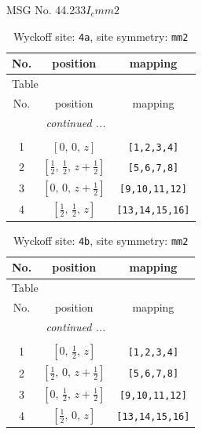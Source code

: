 \documentclass[fleqn,8pt]{jsarticle}
\begin{document}
\setcounter{MaxMatrixCols}{32}

\renewcommand{\tablename}{Table~}
\renewcommand{\figurename}{Figure~}
\begin{center}
\LARGE
MSG No. 44.233\quad$I_{c}mm2$
\end{center}
\renewcommand{\arraystretch}{1.2}
\begin{longtable}{ccc}
\caption{Wyckoff site: {\tt 4a}, site symmetry: {\tt mm2}}
 \\
 \hline \hline
No. & position & mapping \\ \hline \endfirsthead

\multicolumn{2}{l}{\tablename\ \thetable{}} \\
 \hline \hline
No. & position & mapping \\ \hline \endhead

 \hline \hline
\multicolumn{2}{r}{\footnotesize\it continued ...} \\ \endfoot

 \hline \hline
\multicolumn{2}{r}{} \\ \endlastfoot

1 & $\left[ 0,\, 0,\, z \right]$ & {\tt [1,2,3,4]} \\ \hline
2 & $\left[ \frac{1}{2},\, \frac{1}{2},\, z + \frac{1}{2} \right]$ & {\tt [5,6,7,8]} \\ \hline
3 & $\left[ 0,\, 0,\, z + \frac{1}{2} \right]$ & {\tt [9,10,11,12]} \\ \hline
4 & $\left[ \frac{1}{2},\, \frac{1}{2},\, z \right]$ & {\tt [13,14,15,16]} \\
\end{longtable}
\renewcommand{\arraystretch}{1.2}
\begin{longtable}{ccc}
\caption{Wyckoff site: {\tt 4b}, site symmetry: {\tt mm2}}
 \\
 \hline \hline
No. & position & mapping \\ \hline \endfirsthead

\multicolumn{2}{l}{\tablename\ \thetable{}} \\
 \hline \hline
No. & position & mapping \\ \hline \endhead

 \hline \hline
\multicolumn{2}{r}{\footnotesize\it continued ...} \\ \endfoot

 \hline \hline
\multicolumn{2}{r}{} \\ \endlastfoot

1 & $\left[ 0,\, \frac{1}{2},\, z \right]$ & {\tt [1,2,3,4]} \\ \hline
2 & $\left[ \frac{1}{2},\, 0,\, z + \frac{1}{2} \right]$ & {\tt [5,6,7,8]} \\ \hline
3 & $\left[ 0,\, \frac{1}{2},\, z + \frac{1}{2} \right]$ & {\tt [9,10,11,12]} \\ \hline
4 & $\left[ \frac{1}{2},\, 0,\, z \right]$ & {\tt [13,14,15,16]} \\
\end{longtable}
\end{document}
